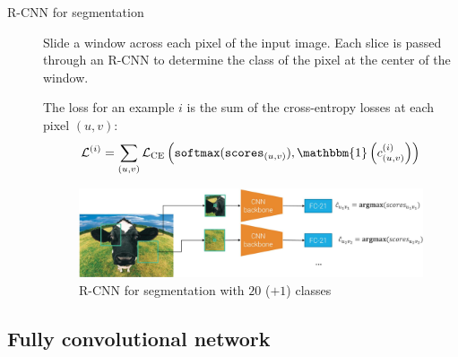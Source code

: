 \begin{description}
    \item[R-CNN for segmentation] 
        Slide a window across each pixel of the input image. Each slice is passed through an R-CNN to determine the class of the pixel at the center of the window.

        The loss for an example $i$ is the sum of the cross-entropy losses at each pixel $(u, v)$:
        \[ \mathcal{L}^{(i)} = \sum_{(u, v)} \mathcal{L}_\text{CE}\left( \texttt{softmax}(\texttt{scores}_{(u, v)}), \mathbbm{1}\left( c_{(u, v)}^{(i)} \right) \right) \]

        \begin{figure}[H]
            \centering
            \includegraphics[width=0.9\linewidth]{./img/_segmentation_rcnn.jpg}
            \caption{R-CNN for segmentation with $20$ ($+1$) classes}
        \end{figure}
\end{description}


\subsection{Fully convolutional network}

